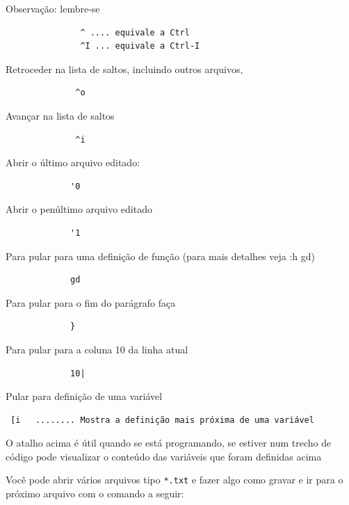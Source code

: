\documentclass[10pt,a4paper,openany]{book}
\begin{document}
Observação: lembre-se

\begin{verbatim}
			   ^ .... equivale a Ctrl
			   ^I ... equivale a Ctrl-I
\end{verbatim}


Retroceder na lista de saltos, incluindo outros arquivos,

\begin{verbatim}
			  ^o
\end{verbatim}

Avançar na lista de saltos

\begin{verbatim}
			  ^i
\end{verbatim}

Abrir o último arquivo editado:

\begin{verbatim}
			 '0
\end{verbatim}

Abrir o penúltimo arquivo editado

\begin{verbatim}
			 '1
\end{verbatim}

Para pular para uma definição de função (para mais detalhes veja :h gd)

\begin{verbatim}
			 gd
\end{verbatim}

Para pular para o fim do parágrafo faça

\begin{verbatim}
			 }
\end{verbatim}

Para pular para a coluna 10 da linha atual

\begin{verbatim}
			 10|
\end{verbatim}

Pular para definição de uma variável

\begin{verbatim}
 [i   ........ Mostra a definição mais próxima de uma variável
\end{verbatim}

O atalho acima é útil quando se está programando, se estiver num
trecho de código pode visualizar o conteúdo das variáveis que foram
definidas acima

Você pode abrir vários arquivos tipo \verb|*.txt| e fazer
algo como gravar e ir para o próximo arquivo com o comando a
seguir:
\end{document}
